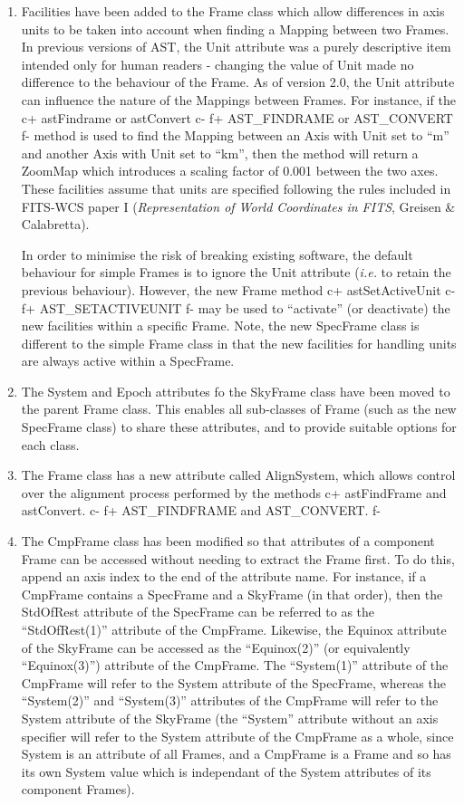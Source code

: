 \documentclass[twoside,11pt]{article}
\begin{document}
\begin{enumerate}
\item Facilities have been added to the Frame class which allow
differences in axis units to be taken into account when finding a Mapping
between two Frames. In previous versions of AST, the Unit attribute was a
purely descriptive item intended only for human readers - changing the
value of Unit made no difference to the behaviour of the Frame. As of
version 2.0, the Unit attribute can influence the nature of the Mappings
between Frames. For instance, if the 
c+
astFindrame or astConvert
c-
f+
AST\_FINDRAME or AST\_CONVERT
f-
method is used to find the Mapping between an Axis with Unit set to ``m''
and another Axis with Unit set to ``km'', then the method will return a 
ZoomMap which introduces a scaling factor of 0.001 between the two axes.
These facilities assume that units are specified following the rules
included in FITS-WCS paper I ({\em Representation of World
Coordinates in FITS}, Greisen \& Calabretta).

In order to minimise the risk of breaking existing software, the default 
behaviour for simple Frames is to ignore the Unit attribute ({\em{i.e.}}
to retain the previous behaviour). However, the new Frame method 
c+
astSetActiveUnit
c-
f+
AST\_SETACTIVEUNIT
f-
may be used to ``activate'' (or deactivate) the new facilities within a 
specific Frame. Note, the new SpecFrame class is different to the simple
Frame class in that the new facilities for handling units are always active
within a SpecFrame. 
 
\item The System and Epoch attributes fo the SkyFrame class have been
moved to the parent Frame class. This enables all sub-classes of Frame
(such as the new SpecFrame class) to share these attributes, and to provide
suitable options for each class.

\item The Frame class has a new attribute called AlignSystem, which allows 
control over the alignment process performed by the methods 
c+
astFindFrame and astConvert.
c-
f+
AST\_FINDFRAME and AST\_CONVERT.
f-


\item The CmpFrame class has been modified so that attributes of a 
component Frame can be accessed without needing to extract the Frame first.
To do this, append an axis index to the end of the attribute name. For
instance, if a CmpFrame contains a SpecFrame and a SkyFrame (in that order), 
then the StdOfRest attribute of the SpecFrame can be referred to as the
``StdOfRest(1)'' attribute of the CmpFrame. Likewise, the Equinox attribute
of the SkyFrame can be accessed as the ``Equinox(2)'' (or equivalently
``Equinox(3)'') attribute of the CmpFrame. The ``System(1)'' attribute of the
CmpFrame will refer to the System attribute of the SpecFrame, whereas the 
``System(2)'' and ``System(3)'' attributes of the CmpFrame will refer to the
System attribute of the SkyFrame (the ``System'' attribute without an axis
specifier will refer to the System attribute of the CmpFrame as a whole,
since System is an attribute of all Frames, and a CmpFrame is a Frame and
so has its own System value which is independant of the System attributes
of its component Frames).


\end{enumerate}
\end{document}
